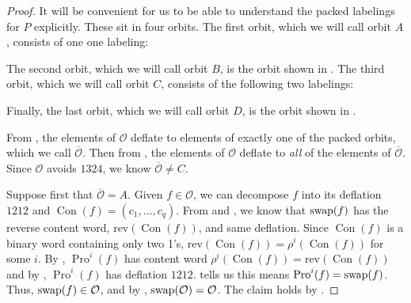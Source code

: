 \documentclass[11pt]{amsart}
\theoremstyle{definition}
\newcommand{\rev}{\mathrm{rev}}
\DeclareMathOperator{\Pro}{\mathrm{Pro}}
\DeclareMathOperator{\Con}{\mathrm{Con}}
\newcommand{\swap}{\textnormal{swap}}
\begin{document}
\begin{proof}
It will be convenient for us to be able to understand the packed labelings for $P$ explicitly. These sit in four orbits.  The first orbit, which we will call orbit $A$, consists of one one labeling:
\begin{center}
\end{center}
The second orbit, which we will call orbit $B$, is the orbit shown in .  The third orbit, which we will call orbit $C$, consists of the following two labelings:
\begin{center}
\end{center}
Finally, the last orbit, which we will call orbit $D$, is the orbit shown in . 

From , the elements of $\mathcal{O}$ deflate to elements of exactly one of the packed orbits, which we call $\overline{\mathcal{O}}$.  Then from , the elements of $\mathcal{O}$ deflate to \emph{all} of the elements of $\overline{\mathcal{O}}$.  Since $\mathcal{O}$ avoids $1324$, we know $\overline{\mathcal{O}}\neq C$.

Suppose first that $\overline{\mathcal{O}}=A$. Given $f \in \mathcal{O}$, we can decompose $f$ into its deflation $1212$ and $\Con(f) = (c_1,\ldots,c_q)$. From  and , we know that $\swap(f)$ has the reverse content word, $\rev(\Con(f))$, and same deflation. Since $\Con(f)$ is a binary word containing only two 1's, $\rev(\Con(f))=\rho^i(\Con(f))$ for some $i$.  By , $\Pro^i(f)$ has content word $\rho^i(\Con(f))=\rev(\Con(f))$ and by , $\Pro^i(f)$ has deflation $1212$.   tells us this means $\Pro^i(f)=\swap(f)$.  Thus, $\swap(f) \in \mathcal{O}$, and by , $\swap(\mathcal{O}) = \mathcal{O}$. The claim holds by .


\end{proof}
\end{document}
